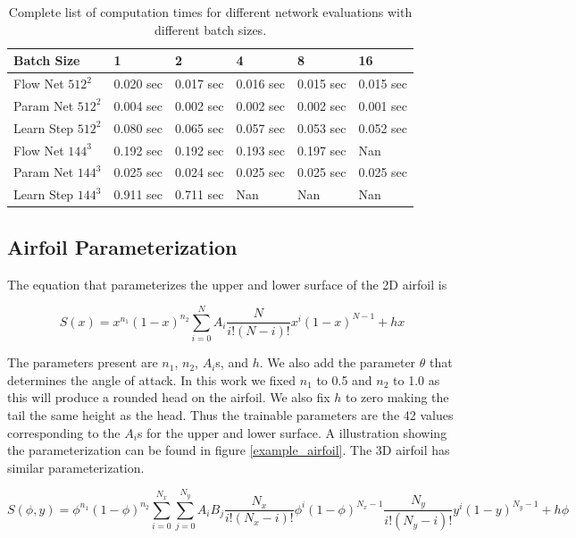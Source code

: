 \documentclass{article} %
\begin{document}
\begin{table}[!h]
\caption{Complete list of computation times for different network evaluations with different batch sizes.}
\label{computation_table}
\begin{center}
\begin{tabular}{l|lllll}
Batch Size & 1 & 2 & 4 & 8 & 16 \\ \hline 
Flow Net $512^2$ & 0.020 sec & 0.017 sec & 0.016 sec & 0.015 sec & 0.015 sec \\ 
Param Net $512^2$ & 0.004 sec & 0.002 sec & 0.002 sec & 0.002 sec & 0.001 sec \\ 
Learn Step $512^2$ & 0.080 sec & 0.065 sec & 0.057 sec & 0.053 sec & 0.052 sec \\ 
Flow Net $144^3$ & 0.192 sec & 0.192 sec & 0.193 sec & 0.197 sec & Nan \\ 
Param Net $144^3$ & 0.025 sec & 0.024 sec & 0.025 sec & 0.025 sec & 0.025 sec \\ 
Learn Step $144^3$ & 0.911 sec & 0.711 sec & Nan & Nan & Nan \\ 
\end{tabular}
\end{center}
\end{table}


\subsection{Airfoil Parameterization}

The equation that parameterizes the upper and lower surface of the 2D airfoil is

\begin{equation}
  S(x) = x^{n_1} (1-x)^{n_2} \sum_{i=0}^{N} A_i \frac{N}{i!(N-i)!} x^i (1-x)^{N-1} + hx
\end{equation}

The parameters present are $n_1$, $n_2$, $A_i$s, and $h$. We also add the parameter $\theta$ that determines the angle of attack. In this work we fixed $n_1$ to 0.5 and $n_2$ to 1.0 as this will produce a rounded head on the airfoil. We also fix $h$ to zero making the tail the same height as the head. Thus the trainable parameters are the 42 values corresponding to the $A_i$s for the upper and lower surface. A illustration showing the parameterization can be found in figure \ref{example_airfoil}. The 3D airfoil has similar parameterization.

\begin{equation}
  S(\phi, y) = \phi^{n_1} (1-\phi)^{n_2} \sum_{i=0}^{N_x} \sum_{j=0}^{N_y} A_i B_j \frac{N_x}{i!(N_x-i)!} \phi^i (1-\phi)^{N_x-1} \frac{N_y}{i!(N_y-i)!} y^i (1-y)^{N_y-1} + h \phi
\end{equation}
\end{document}
